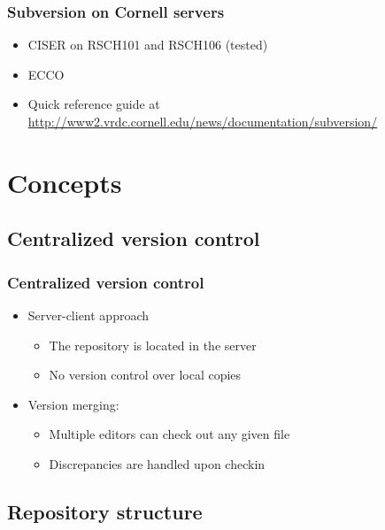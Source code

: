 \documentclass{beamer}
\begin{document}
\frame
{
  \frametitle{Subversion on Cornell servers}
  
  \begin{itemize}
  \item<1-> CISER on RSCH101 and RSCH106 (tested)
  \item<2-> ECCO
  \item<3-> Quick reference guide at \url{http://www2.vrdc.cornell.edu/news/documentation/subversion/}
  \end{itemize}

}

\section{Concepts}

\subsection{Centralized version control}


\frame
{
  \frametitle{Centralized version control}
  
  \begin{itemize}
  \item<1-> Server-client approach
  	\begin{itemize}
	\item<1-> The repository is located in the server
	\item<2-> No version control over local copies
	\end{itemize}
  \item<3-> Version merging:
  	\begin{itemize}
  	\item<3-> Multiple editors can check out any given file
	\item<3-> Discrepancies are handled upon checkin
	\end{itemize}
  \end{itemize}
  
}

\subsection{Repository structure}
\end{document}
